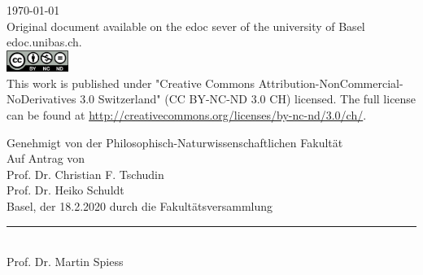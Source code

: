 \begin{titlepage}
\begin{center}
\vfill
{\large \today\\[1cm]}
{\footnotesize Original document available on the edoc sever of the university of Basel edoc.unibas.ch.\\[0.5cm]
\includegraphics[height=7mm]{./inc/cclic.png}~\\[0.5cm]
This work is published under  "Creative Commons Attribution-NonCommercial-NoDerivatives 3.0 Switzerland" (CC BY-NC-ND 3.0 CH) licensed. The full license can be found at \url{http://creativecommons.org/licenses/by-nc-nd/3.0/ch/}.
}

\end{center}
\end{titlepage}

\restoregeometry
\onecolumn
\clearpage\pagestyle{plain}

\begin{center}

Genehmigt von der Philosophisch-Naturwissenschaftlichen Fakult\"at\\
Auf Antrag von\\[0.5cm]
Prof. Dr. Christian F. Tschudin\\Prof. Dr. Heiko Schuldt\\[0.5cm]

Basel, der 18.2.2020 durch die Fakult\"atsversammlung\\[2cm]
{\rule{6cm}{0.2pt}\\ Prof. Dr. Martin Spiess}
\end{center}
\clearpage



\section*{\abstractname}   
\myabstract





